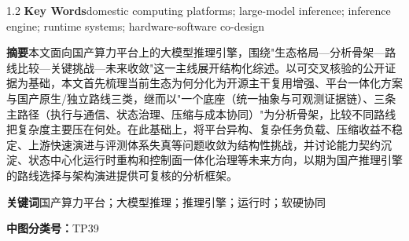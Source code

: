 \documentclass[UTF8,a4paper,12pt]{ctexart}
\begin{document}
\begin{spacing}{1.2}
\vspace{0.4em}
\noindent\textbf{Key Words}\quad domestic computing platforms; large-model inference; inference engine; runtime systems; hardware-software co-design

\vspace{1.2em}
\noindent\textbf{摘要}\quad 本文面向国产算力平台上的大模型推理引擎，围绕"生态格局—分析骨架—路线比较—关键挑战—未来收敛"这一主线展开结构化综述。以可交叉核验的公开证据为基础，本文首先梳理当前生态为何分化为开源主干复用增强、平台一体化方案与国产原生/独立路线三类，继而以"一个底座（统一抽象与可观测证据链）、三条主路径（执行与通信、状态治理、压缩与成本协同）"为分析骨架，比较不同路线把复杂度主要压在何处。在此基础上，将平台异构、复杂任务负载、压缩收益不稳定、上游快速演进与评测体系失真等问题收敛为结构性挑战，并讨论能力契约沉淀、状态中心化运行时重构和控制面一体化治理等未来方向，以期为国产推理引擎的路线选择与架构演进提供可复核的分析框架。

\vspace{0.4em}
\noindent\textbf{关键词}\quad 国产算力平台；大模型推理；推理引擎；运行时；软硬协同

\vspace{0.4em}
\noindent\textbf{中图分类号：}TP39

\end{spacing}
\end{document}
